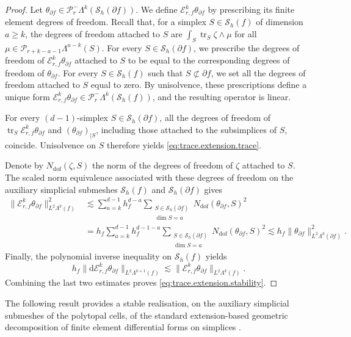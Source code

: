 \documentclass[a4paper,11pt]{article}
\theoremstyle{definition}
\newcommand{\DIFF}{\mathrm{d}}
\newcommand{\Sh}{\mathcal{S}_h}
\newcommand{\PL}[2]{\mathcal{P}_{#1}\Lambda^{#2}}
\newcommand{\PLtrim}[2]{\mathcal{P}_{#1}^{-}\Lambda^{#2}}
\newcommand{\trc}{\operatorname{tr}}
\begin{document}
\begin{proof}
Let $\theta_{\partial f}\in\PLtrim{r}{k}(\Sh(\partial f))$.
We define $\mathcal E_{r,f}^k\theta_{\partial f}$ by prescribing its finite element degrees of freedom.
Recall that, for a simplex $S\in\Sh(f)$ of dimension $a\geq k$, the degrees of freedom attached to $S$ are $\int_S\trc_S\zeta\wedge\mu$ for all $\mu\in\PL{r+k-a-1}{a-k}(S)$.
For every $S\in\Sh(\partial f)$, we prescribe the degrees of freedom of $\mathcal E_{r,f}^k\theta_{\partial f}$ attached to $S$ to be equal to the corresponding degrees of freedom of $\theta_{\partial f}$.
For every $S\in\Sh(f)$ such that $S\not\subset\partial f$, we set all the degrees of freedom attached to $S$ equal to zero.
By unisolvence, these prescriptions define a unique form $\mathcal E_{r,f}^k\theta_{\partial f}\in\PLtrim{r}{k}(\Sh(f))$, and the resulting operator is linear.

For every $(d-1)$-simplex $S\in\Sh(\partial f)$, all the degrees of freedom of $\trc_S\mathcal E_{r,f}^k\theta_{\partial f}$ and $(\theta_{\partial f})_{|S}$, including those attached to the subsimplices of $S$, coincide.
Unisolvence on $S$ therefore yields \eqref{eq:trace.extension.trace}.

Denote by $N_{\mathrm{dof}}(\zeta,S)$ the norm of the degrees of freedom of $\zeta$ attached to $S$.
The scaled norm equivalence associated with these degrees of freedom on the auxiliary simplicial submeshes $\Sh(f)$ and $\Sh(\partial f)$ gives
\[
  \begin{aligned}
  \|\mathcal E_{r,f}^k\theta_{\partial f}\|_{L^2\Lambda^k(f)}^2
  &\lesssim
  \sum_{a=k}^{d-1}
  h_f^{d-a}
  \sum_{\substack{S\in\Sh(\partial f)\\\dim S=a}}
  N_{\mathrm{dof}}(\theta_{\partial f},S)^2
  \\
  &=
  h_f
  \sum_{a=k}^{d-1}
  h_f^{d-1-a}
  \sum_{\substack{S\in\Sh(\partial f)\\\dim S=a}}
  N_{\mathrm{dof}}(\theta_{\partial f},S)^2
  \lesssim
  h_f\|\theta_{\partial f}\|_{L^2\Lambda^k(\partial f)}^2.
  \end{aligned}
\]
Finally, the polynomial inverse inequality on $\Sh(f)$ yields
\[
  h_f\|\DIFF\mathcal E_{r,f}^k\theta_{\partial f}\|_{L^2\Lambda^{k+1}(f)}
  \lesssim
  \|\mathcal E_{r,f}^k\theta_{\partial f}\|_{L^2\Lambda^k(f)}.
\]
Combining the last two estimates proves \eqref{eq:trace.extension.stability}.
\end{proof}

The following result provides a stable realisation, on the auxiliary simplicial submeshes of the polytopal cells, of the standard extension-based geometric decomposition of finite element differential forms on simplices \cite{Arnold.Falk.ea:06,Arnold.Falk.ea:09}.
\end{document}
